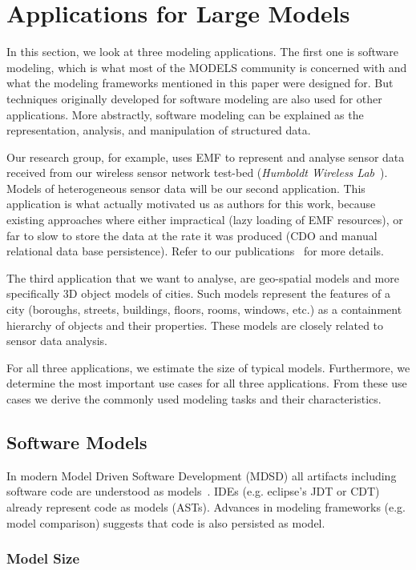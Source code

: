 \section{Applications for Large Models}

In this section, we look at three modeling applications. The first one is software modeling, which is what most of the MODELS community is concerned with and what the modeling frameworks mentioned in this paper were designed for. But techniques originally developed for software modeling are also used for other applications. More abstractly, software modeling can be explained as the representation, analysis, and manipulation of structured data. 

Our research group, for example, uses EMF to represent and analyse sensor data received from our wireless sensor network test-bed (\emph{Humboldt Wireless Lab}~\cite{hwl}). Models of heterogeneous sensor data will be our second application. 
This application is what actually motivated us as authors for this work, because existing approaches where either impractical (lazy loading of EMF resources), or far to slow to store the data at the rate it was produced (CDO and manual relational data base persistence). 
Refer to our publications~\cite{1,2} for more details. 

The third application that we want to analyse, are geo-spatial models and more specifically 3D object models of cities. Such models represent the features of a city (boroughs, streets, buildings, floors, rooms, windows, etc.) as a containment hierarchy of objects and their properties. 
These models are closely related to sensor data analysis.

For all three applications, we estimate the size of typical models. Furthermore, we determine the most important use cases for all three applications. From these use cases we derive the commonly used modeling tasks and their characteristics.

\subsection{Software Models}
In modern Model Driven Software Development (MDSD) all artifacts including software code are understood as models~. IDEs (e.g. eclipse's JDT or CDT) already represent code as models (ASTs). Advances in modeling frameworks (e.g. model comparison) suggests that code is also persisted as model.

\subsubsection*{Model Size}

